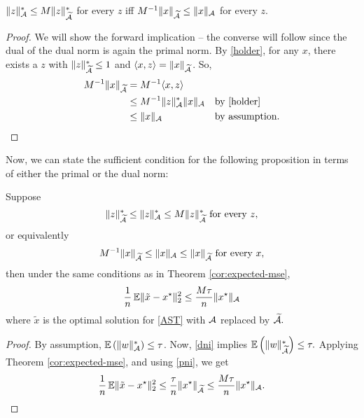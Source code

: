 \begin{lemma}
${\lVert z\rVert_{\mathcal{A}}^* \leq M\lVert z\rVert_{\widetilde{\mathcal{A}}}^*}$ for every $z$ iff
${M^{-1}\lVert x\rVert_{\widetilde{\mathcal{A}}} \leq \lVert x\rVert_{\mathcal{A}}}$ for every $z$.
\end{lemma}
\begin{proof}\belowdisplayskip=-12pt
We will show the forward implication -- the converse will follow since the dual
of the dual norm is again the primal norm. By \eqref{holder}, for any $x$, there exists a $z$ with
$\lVert z\rVert_{\widetilde{\mathcal{A}}}^* \leq 1$ and ${\langle x, z\rangle =
\lVert x\rVert_{\widetilde{\mathcal{A}}}}$. So,
\begin{align*}
M^{-1}\lVert x\rVert_{\widetilde{\mathcal{A}}} &= M^{-1}\langle x, z\rangle &&\\
&\leq M^{-1}\lVert z\rVert_{\mathcal{A}}^* \lVert x\rVert_{\mathcal{A}} &&\text{by \eqref{holder}}\\
&\leq \lVert x\rVert_{\mathcal{A}} &&\text{by assumption.}
\end{align*}
\end{proof}
Now, we can state the sufficient condition for the following proposition in
terms of either the primal or the dual norm:
\begin{prop}\label{prop:grid-approx-mse}
Suppose 
\begin{equation}
  \label{dni}
  \lVert z\rVert_{\widetilde{\mathcal{A}}}^* \leq \lVert z\rVert_{\mathcal{A}}^* \leq M\lVert z\rVert_{\widetilde{\mathcal{A}}}^* \text{ for every } z,
\end{equation}
or equivalently 
\begin{equation}
  \label{pni}
  M^{-1}\lVert x\rVert_{\widetilde{\mathcal{A}}} \leq \lVert x\rVert_{\mathcal{A}} \leq \lVert x\rVert_{\widetilde{\mathcal{A}}} \text{ for every } x,
\end{equation}
then under the same conditions as in Theorem \ref{cor:expected-mse},
\begin{equation*}
    \frac{1}{n} \operatorname{\mathbb{E}} \lVert\tilde{x} - x^\star\rVert_2^2 \leq \frac{M \tau}{n}\lVert x^\star\rVert_{\mathcal{A}}
\end{equation*}
where $\tilde{x}$ is the optimal solution for \eqref{AST} with $\mathcal{A}$ replaced by $\widetilde{\mathcal{A}}.$
\end{prop}
\begin{proof}\belowdisplayskip=-12pt
By assumption, $\operatorname{\mathbb{E}}\left(\lVert w\rVert_{\mathcal{A}}^*\right) \leq \tau$. Now, \eqref{dni}
implies $\operatorname{\mathbb{E}}\left(\lVert w\rVert_{\widetilde{\mathcal{A}}}^*\right) \leq \tau.$ Applying
Theorem \ref{cor:expected-mse}, and using \eqref{pni}, we get
\begin{equation*}
\frac{1}{n} \operatorname{\mathbb{E}} \lVert\tilde{x} - x^\star\rVert_2^2 \leq \frac{\tau}{n}\lVert x^\star\rVert_{\widetilde{\mathcal{A}}} \leq \frac{M \tau}{n}\lVert x^\star\rVert_{\mathcal{A}}.
\end{equation*}
\end{proof}

